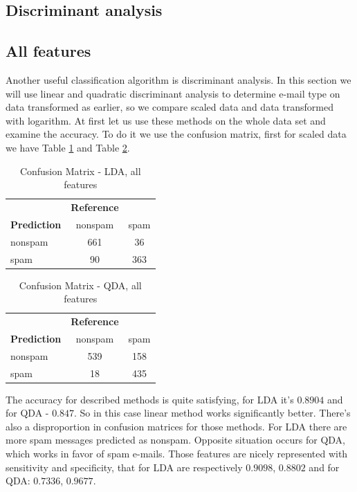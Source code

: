 \documentclass{article}\usepackage[]{graphicx}\usepackage[]{xcolor}
\begin{document}
\subsection*{Discriminant analysis}
	
\subsection*{All features}
	
Another useful classification algorithm is discriminant analysis. In this section 
we will use linear and quadratic discriminant analysis to determine e-mail type on 
data transformed as earlier, so we compare scaled data and data transformed with logarithm. 
At first let us use these methods on the whole data set and examine the accuracy. 
To do it we use the confusion matrix, first for scaled data we have Table 
\ref{tab:confusion_matrix_lda1} and Table \ref{tab:confusion_matrix_qda1}.
	
	\begin{table}[h]
		\centering
		\begin{tabular}{lcc}
			& \textbf{Reference} & \\
			\textbf{Prediction} & nonspam & spam \\
			nonspam & 661 & 36 \\
			spam & 90 & 363 \\
		\end{tabular}
		\caption{Confusion Matrix - LDA, all features}
		\label{tab:confusion_matrix_lda1}
	\end{table}
	
	\begin{table}[h]
		\centering
		\begin{tabular}{lcc}
			& \textbf{Reference} & \\
			\textbf{Prediction} & nonspam & spam \\
			nonspam & 539 & 158 \\
			spam & 18 & 435 \\
		\end{tabular}
		\caption{Confusion Matrix - QDA, all features}
		\label{tab:confusion_matrix_qda1}
	\end{table}

The accuracy for described methods is quite satisfying, for LDA it's $0.8904$ 
and for QDA - $0.847$. So in this case linear method works significantly better. 
There's also a disproportion in confusion matrices for those methods. For LDA there 
are more spam messages predicted as nonspam. Opposite situation occurs for QDA, which 
works in favor of spam e-mails. Those features are nicely represented with sensitivity 
and specificity, that for LDA are respectively $0.9098$, $0.8802$ and for QDA: $0.7336$, $0.9677$. 
\end{document}
